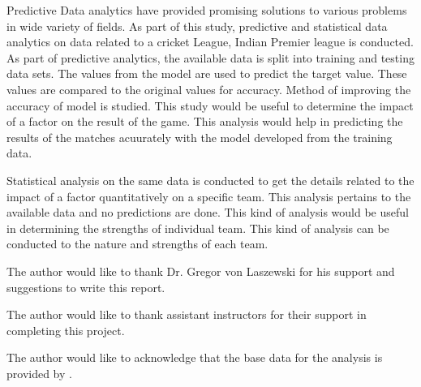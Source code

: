 \documentclass[sigconf]{acmart}
\begin{document}
Predictive Data analytics have provided promising solutions to various problems in wide variety of fields. As part of this study, predictive and statistical data analytics on data related to a cricket League, Indian Premier league is conducted.  As part of predictive analytics, the available data is split into training and testing data sets. The values from the model are used to predict the target value. These values are compared to the original values for accuracy. Method of improving the accuracy of model is studied. This study would be useful to determine the impact of a factor on the result of the game. This analysis would help in predicting the results of the matches acuurately with the model developed from the training data.

Statistical analysis on the same data is conducted to get the details related to the impact of a factor quantitatively on a specific team. This analysis pertains to the available data and no predictions are done. This kind of analysis would be useful in determining the strengths of individual team. This kind of analysis can be conducted to the nature and strengths of each team.

\begin{acks}

  The author would like to thank Dr. Gregor von Laszewski for his
  support and suggestions to write this report.
  
  The author would like to thank assistant instructors for their support in completing this project.
  
  The author would like to acknowledge that the base data for the analysis is provided  by \cite{data} .
  

\end{acks}


 

\appendix
\end{document}
